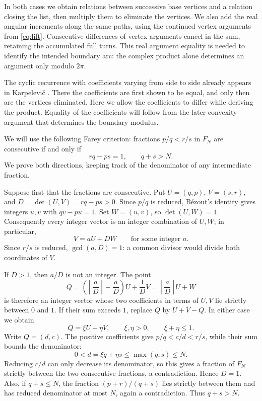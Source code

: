 \documentclass[11pt,a4paper]{article}
\theoremstyle{definition}
\theoremstyle{remark}
\numberwithin{equation}{section}
\begin{document}
In both cases we obtain relations between successive base vertices and a relation closing the list, then multiply them to eliminate the vertices. We also add the real angular increments along the same paths, using the continued vertex arguments from \eqref{eq:lift}. Consecutive differences of vertex arguments cancel in the sum, retaining the accumulated full turns. This real argument equality is needed to identify the intended boundary arc: the complex product alone determines an argument only modulo $2\pi$.

The cyclic recurrence with coefficients varying from side to side already appears in Karpelevi\v{c} \cite[Theorem~VI and equation~(13), pp.~375--376 of the Russian original]{Karp}. There the coefficients are first shown to be equal, and only then are the vertices eliminated. Here we allow the coefficients to differ while deriving the product. Equality of the coefficients will follow from the later convexity argument that determines the boundary modulus.

We will use the following Farey criterion: fractions $p/q<r/s$ in $F_N$ are consecutive if and only if
\[
 rq-ps=1,\qquad q+s>N.
\]
We prove both directions, keeping track of the denominator of any intermediate fraction.

Suppose first that the fractions are consecutive. Put $U=(q,p)$, $V=(s,r)$, and $D=\det(U,V)=rq-ps>0$. Since $p/q$ is reduced, B\'ezout's identity gives integers $u,v$ with $qv-pu=1$. Set $W=(u,v)$, so $\det(U,W)=1$. Consequently every integer vector is an integer combination of $U,W$; in particular,
\[
 V=aU+DW\qquad\text{for some integer }a.
\]
Since $r/s$ is reduced, $\gcd(a,D)=1$: a common divisor would divide both coordinates of $V$.

If $D>1$, then $a/D$ is not an integer. The point
\[
 Q=\left(\left\lceil\frac aD\right\rceil-\frac aD\right)U
       +\frac1D V
   =\left\lceil\frac aD\right\rceil U+W
\]
is therefore an integer vector whose two coefficients in terms of $U,V$ lie strictly between $0$ and $1$. If their sum exceeds $1$, replace $Q$ by $U+V-Q$. In either case we obtain
\[
 Q=\xi U+\eta V,\qquad \xi,\eta>0,\qquad \xi+\eta\le1.
\]
Write $Q=(d,c)$. The positive coefficients give $p/q<c/d<r/s$, while their sum bounds the denominator:
\[
 0<d=\xi q+\eta s\le\max(q,s)\le N.
\]
Reducing $c/d$ can only decrease its denominator, so this gives a fraction of $F_N$ strictly between the two consecutive fractions, a contradiction. Hence $D=1$. Also, if $q+s\le N$, the fraction $(p+r)/(q+s)$ lies strictly between them and has reduced denominator at most $N$, again a contradiction. Thus $q+s>N$.
\end{document}

